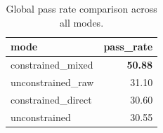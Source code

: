 \begin{table}[htbp]
  \centering
  \caption{Global pass rate comparison across all modes.}
  \label{tab:global_pass_rate}
  \begin{tabular}{lr}
    \toprule
    mode & pass\_rate \\
    \midrule
    constrained\_mixed & \textbf{50.88} \\
    unconstrained\_raw & 31.10 \\
    constrained\_direct & 30.60 \\
    unconstrained & 30.55 \\
    \bottomrule
  \end{tabular}
\end{table}